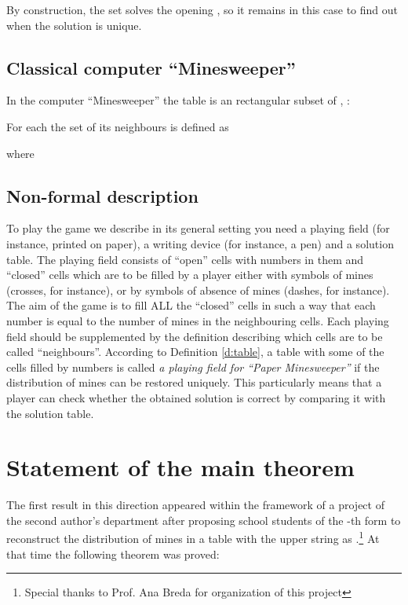 \documentclass[english,12pt]{article}
\theoremstyle{remark}
\theoremstyle{definition}
\theoremstyle{definition}
\begin{document}
By construction, the set  solves the opening ,
so it remains in this case to find out when the solution is
unique.














\subsection{Classical computer ``Minesweeper''}
  In the computer ``Minesweeper'' the table is an  rectangular subset  of
  , :
  
  For each  the set of its neighbours is defined as
  
  where
  


\subsection{Non-formal description}
To play the game we describe in its general setting you need a
playing field (for instance, printed on paper), a writing device
(for instance, a pen) and a solution table. The playing field
consists of ``open'' cells with numbers in them and ``closed''
cells which are to be filled by a player either with symbols of
mines (crosses, for instance), or by symbols of absence of mines
(dashes, for instance). The aim of the game is to fill ALL the
``closed'' cells in such a way that each number is equal to the
number of mines in the neighbouring cells. Each playing field
should be supplemented by the definition describing which cells
are to be called ``neighbours''. According to Definition
\ref{d:table}, a table with some of the cells filled by numbers is
called \emph{a playing field for ``Paper Minesweeper''} if the
distribution of mines can be restored uniquely. This particularly
means that a player can check whether the obtained solution is
correct by comparing it with the solution table.



\section{Statement of the main theorem}

 The first result in this direction appeared within the framework
of a project of the second author's department after proposing school students of the -th form
to reconstruct the distribution of mines in a table  with the upper string as
.\footnote{Special thanks to Prof. Ana Breda for organization of this project} At that time the
following theorem was proved:
\end{document}
